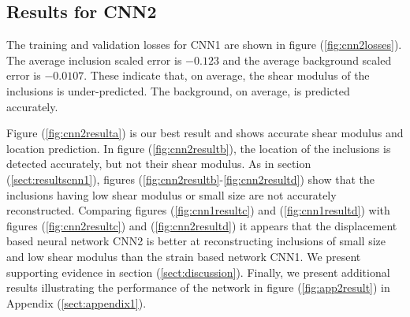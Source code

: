 \documentclass[10pt]{article}
\begin{document}
\subsection{\label{sect:resultscnn2}Results for CNN2}
The training and validation losses for CNN1 are shown in figure (\ref{fig:cnn2losses}). The average inclusion scaled error is $-0.123$ and the average background scaled error is $-0.0107$. These indicate that, on average, the shear modulus of the inclusions is under-predicted. The background, on average, is predicted accurately.

Figure (\ref{fig:cnn2resulta}) is our best result and shows accurate shear modulus and location prediction. In figure (\ref{fig:cnn2resultb}), the location of the inclusions is detected accurately, but not their shear modulus. As in section (\ref{sect:resultscnn1}), figures (\ref{fig:cnn2resultb}-\ref{fig:cnn2resultd}) show that the inclusions having low shear modulus or small size are not accurately reconstructed. Comparing figures (\ref{fig:cnn1resultc}) and (\ref{fig:cnn1resultd}) with figures (\ref{fig:cnn2resultc}) and (\ref{fig:cnn2resultd}) it appears that the displacement based neural network CNN2 is better at reconstructing inclusions of small size and low shear modulus than the strain based network CNN1. We present supporting evidence in section (\ref{sect:discussion}). Finally, we present additional results illustrating the performance of the network in figure (\ref{fig:app2result}) in Appendix (\ref{sect:appendix1}).
\end{document}

